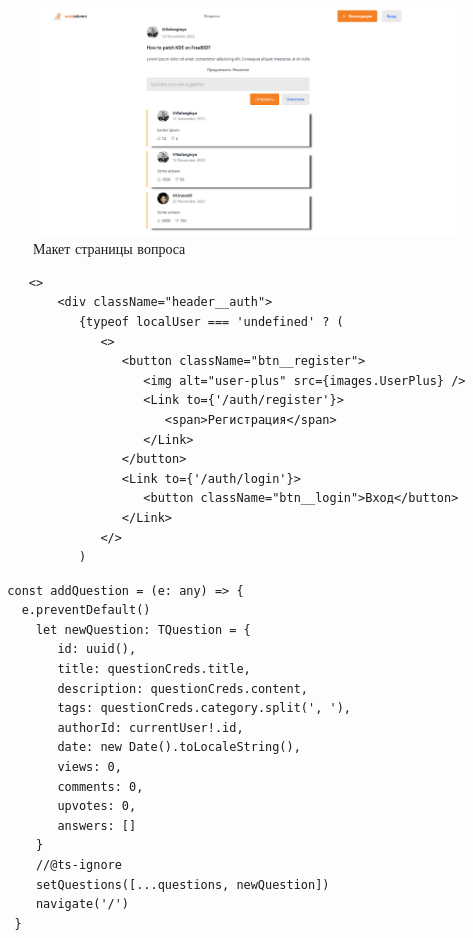 \documentclass[aspectratio=169]{beamer}
\begin{document}
\begin{frame}
  \begin{figure}
    \centering
    \includegraphics[width=1\textwidth]{assets/q.png}
    \caption{Макет страницы вопроса}
  \end{figure}
\end{frame}
\begin{frame}[fragile]
  \begin{verbatim}
     <>
         <div className="header__auth">
            {typeof localUser === 'undefined' ? (
               <>
                  <button className="btn__register">
                     <img alt="user-plus" src={images.UserPlus} />
                     <Link to={'/auth/register'}>
                        <span>Регистрация</span>
                     </Link>
                  </button>
                  <Link to={'/auth/login'}>
                     <button className="btn__login">Вход</button>
                  </Link>
               </>
            ) 
  \end{verbatim}
\end{frame}
\begin{frame}[fragile]
  \begin{verbatim}
  const addQuestion = (e: any) => {
    e.preventDefault()    
      let newQuestion: TQuestion = {
         id: uuid(),
         title: questionCreds.title,
         description: questionCreds.content,
         tags: questionCreds.category.split(', '),
         authorId: currentUser!.id,
         date: new Date().toLocaleString(),
         views: 0,
         comments: 0,
         upvotes: 0,
         answers: []
      }
      //@ts-ignore
      setQuestions([...questions, newQuestion])
      navigate('/')
   }

  \end{verbatim}
\end{frame}
\end{document}
